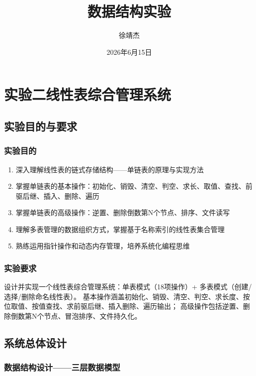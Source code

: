 \documentclass[supercite]{Experimental_Report}
\title{~~~~~~数据结构实验~~~~~~}
\author{徐靖杰}
\date{2026年6月15日}
\begin{document}
\maketitle
\clearpage
{}
\tableofcontents
\clearpage
{}

\section{实验二\quad 线性表综合管理系统}

\subsection{实验目的与要求}

\subsubsection{实验目的}

\begin{enumerate}
    \item 深入理解线性表的链式存储结构——单链表的原理与实现方法
    \item 掌握单链表的基本操作：初始化、销毁、清空、判空、求长、取值、查找、前驱后继、插入、删除、遍历
    \item 掌握单链表的高级操作：逆置、删除倒数第N个节点、排序、文件读写
    \item 理解多表管理的数据组织方式，掌握基于名称索引的线性表集合管理
    \item 熟练运用指针操作和动态内存管理，培养系统化编程思维
\end{enumerate}

\subsubsection{实验要求}
设计并实现一个线性表综合管理系统：单表模式（18项操作）+ 多表模式（创建/选择/删除命名线性表）。
基本操作涵盖初始化、销毁、清空、判空、求长度、按位取值、按值查找、求前驱后继、插入删除、遍历输出；
高级操作包括逆置、删除倒数第N个节点、冒泡排序、文件持久化。

\subsection{系统总体设计}

\subsubsection{数据结构设计——三层数据模型}
\end{document}

